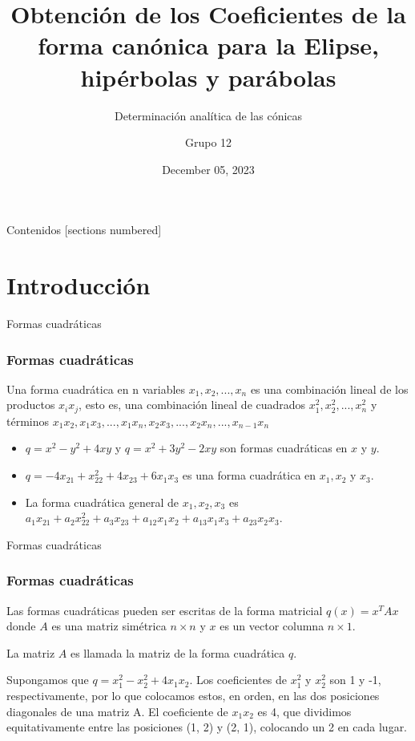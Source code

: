\documentclass[xcolor={dvipsnames},aspectratio=169,10pt]{beamer}
\title{Obtención de los Coeficientes de la forma canónica para la Elipse, hipérbolas y parábolas}
\subtitle{Determinación analítica de las cónicas}
\author{Grupo 12}
\date{December 05, 2023}
\begin{document}
\maketitle%

\begin{frame}{Contenidos}
  [sections numbered]
  \tableofcontents[hideallsubsections]
\end{frame}

\section{Introducción}

\begin{frame}{Formas cuadráticas}
    \frametitle{Formas cuadráticas}
    \begin{definition}
      Una forma cuadrática en n variables $x_{1}, x_{2}, . . . , x_{n}$ es una combinación lineal de los
      productos $x_{i} x_{j}$, esto es, una combinación lineal de cuadrados $x_{1}^2 , x_{2}^2 , . . . , x_{n}^2$ y
      términos $x_{1}x_{2}, x_{1}x_{3}, . . . , x_{1}x_{n}, x_{2}x_{3}, . . . , x_{2}x_{n}, . . . , x_{n-1}x_{n}$
    \end{definition}

  \begin{example}
    \begin{itemize}
        \item $q = x^2 - y^2 + 4xy$ y $q = x^2 + 3y^2 - 2xy$ son formas cuadráticas en $x$ y $y$.
        \item $q = -4x_{21} + x_{22}^2 + 4x_{23} + 6x_{1}x_{3}$ es una forma cuadrática en $x_{1}, x_{2}$ y $x_{3}$.
        \item La forma cuadrática general de $x_{1}, x_{2}, x_{3}$ es $a_{1}x_{21} + a_{2}x_{22}^2 + a_{3}x_{23} + a_{12}x_{1}x_{2} + a_{13}x_{1}x_{3} + a_{23}x_{2}x_{3}$.
    \end{itemize}
  \end{example}
\end{frame}

\begin{frame}{Formas cuadráticas}
  \frametitle{Formas cuadráticas}
  Las formas cuadráticas pueden ser escritas de la forma matricial $q(x) = x^{T}Ax$ donde $A$ es una matriz simétrica $n 
  \times n$ y $x$ es un vector columna $n \times 1$.

  La matriz $A$ es llamada la matriz de la forma cuadrática $q$.

  \begin{example}
    Supongamos que $q = x_1^2 - x_2^2 + 4x_1x_2$. Los coeficientes de $x_1^2$ y $x_2^2$ son 1 y -1, 
    respectivamente, por lo que colocamos estos, en orden, en las dos posiciones diagonales de una matriz A. 
    El coeficiente de $x_1x_2$ es 4, que dividimos equitativamente entre las posiciones (1, 2) y (2, 1), 
    colocando un 2 en cada lugar.
  \end{example}
\end{frame}
\end{document}
